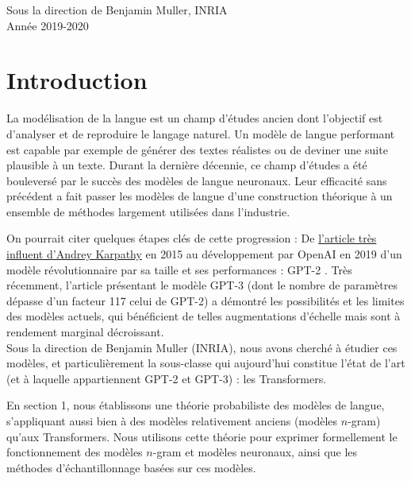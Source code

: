 \begin{titlepage}
\begin{center}
       \vfill
 
       \vspace{0.8cm}
       \Large
       Sous la direction de Benjamin Muller, INRIA \\
       \large
       Année 2019-2020
 
   \end{center}
\end{titlepage}

\tableofcontents

\newpage

\section*{Introduction}

La modélisation de la langue est un champ d'études ancien dont l'objectif est d'analyser et de reproduire le langage naturel. Un modèle de langue performant est capable par exemple de générer des textes réalistes ou de deviner une suite plausible à un texte.
Durant la dernière décennie, ce champ d'études a été bouleversé par le succès des modèles de langue neuronaux.
Leur efficacité sans précédent a fait passer les modèles de langue d'une construction théorique à un ensemble de méthodes largement utilisées dans l'industrie.

On pourrait citer quelques étapes clés de cette progression : De \href{http://karpathy.github.io/2015/05/21/rnn-effectiveness/}{l'article très influent d'Andrey Karpathy} en 2015 au développement par OpenAI en 2019 d'un modèle révolutionnaire par sa taille et ses performances : GPT-2 \cite{radford2019gpt2}.
Très récemment, l'article présentant le modèle GPT-3 (dont le nombre de paramètres dépasse d'un facteur 117 celui de GPT-2) \cite{brown2020language} a démontré les possibilités et les limites des modèles actuels, qui bénéficient de telles augmentations d'échelle mais sont à rendement marginal décroissant. \\

Sous la direction de Benjamin Muller (INRIA), nous avons cherché à étudier ces modèles, et particulièrement la sous-classe qui aujourd'hui constitue l'état de l'art (et à laquelle appartiennent GPT-2 et GPT-3) : les Transformers.

En section 1, nous établissons une théorie probabiliste des modèles de langue, s'appliquant aussi bien à des modèles relativement anciens (modèles $n$-gram) qu'aux Transformers. Nous utilisons cette théorie pour exprimer formellement le fonctionnement des modèles $n$-gram et modèles neuronaux, ainsi que les méthodes d'échantillonnage basées sur ces modèles.

